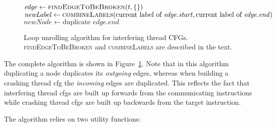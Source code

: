 \begin{figure}
\begin{algorithmic}
       \State $\mathit{edge} \gets \textsc{findEdgeToBeBroken}(t, \{\})$
       \State $\mathit{newLabel} \gets \textsc{combineLabels}(\text{current label of } \mathit{edge}.\mathit{start}, \text{current label of } \mathit{edge}.\mathit{end})$
       \Else
           \State $\mathit{newNode} \gets \text{duplicate } \mathit{edge}.\mathit{end}$
           \EndFor
       \EndIf
    \EndWhile
  \EndFor
\end{algorithmic}
\caption{Loop unrolling algorithm for interfering thread CFGs.
  \textsc{findEdgeToBeBroken} and \textsc{combineLabels} are described
  in the text.}
\label{fig:derive:store_cfg_unroll_alg}
\end{figure}

The complete algorithm is shown in
Figure~\ref{fig:derive:store_cfg_unroll_alg}.  Note that in this
algorithm duplicating a node duplicates its \emph{outgoing} edges,
whereas when building a crashing thread \gls{cfg} the \emph{incoming} edges
are duplicated.  This reflects the fact that interfering thread \glspl{cfg}
are built up forwards from the communicating instructions while crashing
thread \glspl{cfg} are built up backwards from the target instruction.

The algorithm relies on two utility functions:


